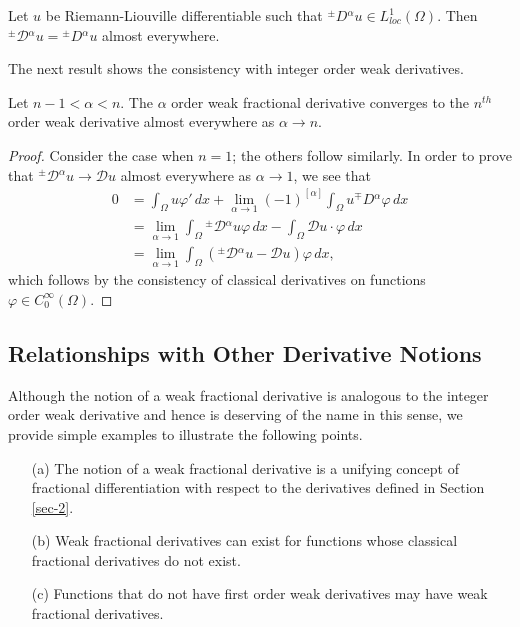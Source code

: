 \documentclass[leqno,final]{siamltex}
\numberwithin{equation}{section}
\renewcommand{\(}{\bigl(}
\renewcommand{\)}{\bigr)}
\begin{document}
 \begin{proposition}\label{Weak=RL}
	Let $u$ be Riemann-Liouville differentiable such that ${^{\pm}}{D}{^{\alpha}}u \in L^{1}_{loc}(\Omega)$. Then ${^{\pm}}{\mathcal{D}}{^{\alpha}} u = {^{\pm}}{D}{^{\alpha}} u$ almost everywhere.
\end{proposition}


The next result shows the consistency with integer order weak derivatives.


\begin{proposition}
    Let $n - 1 < \alpha <n$. The $\alpha$ order weak fractional derivative converges to the $n^{th}$ order weak derivative almost everywhere as $\alpha \rightarrow n$. 
\end{proposition}

\begin{proof}
    Consider the case when $n=1$; the others follow similarly. In order to prove that ${^{\pm}}{\mathcal{D}}{^{\alpha}} u \rightarrow \mathcal{D}u$ almost everywhere as $\alpha \rightarrow 1$, we see that
    \begin{align*}
        0 %
        &= \int_{\Omega} u \varphi'\,dx + \lim_{\alpha \rightarrow 1} (-1)^{[\alpha]} \int_{\Omega} u {^{\mp}}{D}{^{\alpha}} \varphi\,dx \\ 
        &= \lim_{\alpha \rightarrow 1}  \int_{\Omega} {^{\pm}}{\mathcal{D}}{^{\alpha}} u \varphi\,dx - \int_{\Omega} \mathcal{D}u \cdot \varphi\,dx \\
        &= \lim_{\alpha \rightarrow 1} \int_{\Omega} (  {^{\pm}}{\mathcal{D}}{^{\alpha}} u  - \mathcal{D}u) \varphi\,dx,
    \end{align*}
    which follows by the consistency of classical derivatives on functions $\varphi \in C^{\infty}_{0}(\Omega)$.
\end{proof}

 
    \subsection{Relationships with Other Derivative Notions}\label{sec-4.2}
    Although the notion of a weak fractional derivative is analogous to the integer order weak derivative and hence is deserving of the name in this sense, we provide simple examples to illustrate the following points.
    \begin{itemize}
        \item [(a)] The notion of a weak fractional derivative is a unifying concept of fractional differentiation with respect to the derivatives defined in Section \ref{sec-2}.
        \item[(b)]  Weak fractional derivatives can exist for functions whose classical fractional
        derivatives do not exist. 
        \item[(c)] Functions that do not have first order weak derivatives may have weak fractional derivatives. 
    \end{itemize}
    
\end{document}
